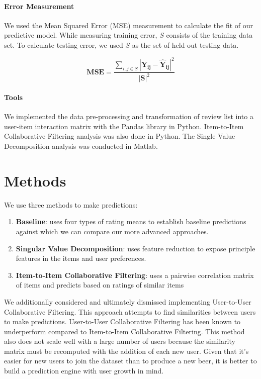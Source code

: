 \documentclass[12pt]{article}
\begin{document}
\paragraph{Error Measurement}
We used the Mean Squared Error (MSE) measurement to calculate the fit of our predictive model. While measuring training error, $S$ consists of the training data set. To calculate testing error, we used $S$ as the set of held-out testing data.

$$ \mathbf{MSE} = \frac{\sum\limits_{i,j \in S} {\mathbf{|Y_{ij} - \hat{Y}_{ij}|}}^2}{{\mathbf{|S|}}^2} $$

\paragraph{Tools}
We implemented the data pre-processing and transformation of review list into a user-item interaction matrix with the Pandas library in Python. Item-to-Item Collaborative Filtering analysis was also done in Python. The Single Value Decomposition analysis was conducted in Matlab.

\section{Methods}
We use three methods to make predictions:

\begin{enumerate}
  \item \textbf{Baseline}: uses four types of rating means to establish baseline predictions against which we can compare our more advanced approaches.
  \item \textbf{Singular Value Decomposition}: uses feature reduction to expose principle features in the items and user preferences.
  \item \textbf{Item-to-Item Collaborative Filtering}: uses a pairwise correlation matrix of items and predicts based on ratings of similar items
\end{enumerate}

We additionally considered and ultimately dismissed implementing User-to-User Collaborative Filtering. This approach attempts to find similarities between users to make predictions. User-to-User Collaborative Filtering has been known to underperform compared to Item-to-Item Collaborative Filtering.\textsuperscript{\cite{sarwar}} This method also does not scale well with a large number of users because the similarity matrix must be recomputed with the addition of each new user. Given that it's easier for new users to join the dataset than to produce a new beer, it is better to build a prediction engine with user growth in mind.\textsuperscript{\cite{linden}}
\end{document}
